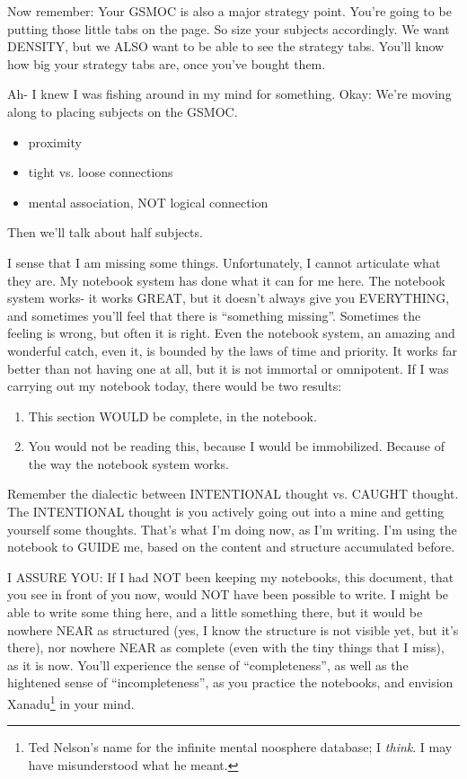 \documentclass[oneside]{book}
\begin{document}
Now remember: Your GSMOC is also a major strategy point. You're going
to be putting those little tabs on the page. So size your subjects
accordingly. We want DENSITY, but we ALSO want to be able to see the
strategy tabs. You'll know how big your strategy tabs are, once you've
bought them.

Ah- I knew I was fishing around in my mind for something.
Okay: We're moving along to placing subjects on the GSMOC.

\begin{itemize}
\item proximity
\item tight vs. loose connections
\item mental association, NOT logical connection
\end{itemize}

Then we'll talk about half subjects.

I sense that I am missing some things. Unfortunately, I cannot
articulate what they are. My notebook system has done what it can for
me here. The notebook system works- it works GREAT, but it doesn't
always give you EVERYTHING, and sometimes you'll feel that there is
``something missing''. Sometimes the feeling is wrong, but often it is
right. Even the notebook system, an amazing and wonderful catch, even
it, is bounded by the laws of time and priority. It works far better
than not having one at all, but it is not immortal or omnipotent. If I
was carrying out my notebook today, there would be two results:

\begin{enumerate}
\item This section WOULD be complete, in the notebook.
\item You would not be reading this, because I would be
immobilized. Because of the way the notebook system works.
\end{enumerate}

Remember the dialectic between INTENTIONAL thought vs. CAUGHT
thought. The INTENTIONAL thought is you actively going out into a mine
and getting yourself some thoughts. That's what I'm doing now, as I'm
writing. I'm using the notebook to GUIDE me, based on the content and
structure accumulated before.

I ASSURE YOU: If I had NOT been keeping my notebooks, this document,
that you see in front of you now, would NOT have been possible to
write. I might be able to write some thing here, and a little
something there, but it would be nowhere NEAR as structured (yes, I
know the structure is not visible yet, but it's there), nor nowhere
NEAR as complete (even with the tiny things that I miss), as it is
now. You'll experience the sense of ``completeness'', as well as the
hightened sense of ``incompleteness'', as you practice the notebooks,
and envision Xanadu\footnote{
Ted Nelson's name for the infinite mental
noosphere database; I \emph{think}. I may have misunderstood what he
meant.}
in your mind.
\end{document}
